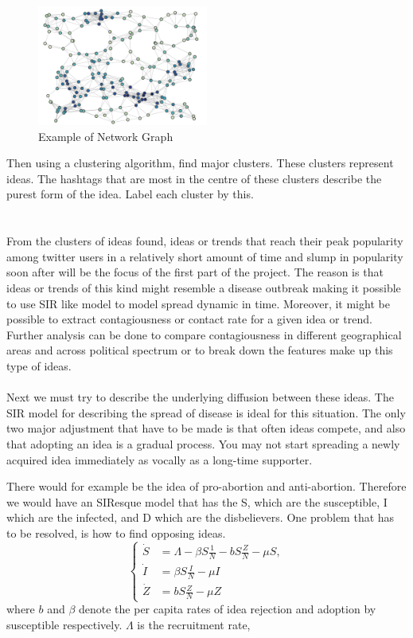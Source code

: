 \documentclass[11pt]{article}
\theoremstyle{plain}
\theoremstyle{definition}
\begin{document}
\begin{figure}[h]
\caption{Example of Network Graph}
\centering
\includegraphics[width=0.5\textwidth]{network_graph}
\end{figure}
Then using a clustering algorithm, find major clusters. These clusters represent ideas. The hashtags that are most in the centre of these clusters describe the purest form of the idea. Label each cluster by this.\\
\\ 
\\ From the clusters of ideas found, ideas or trends that reach their peak popularity among twitter users in a relatively short amount of time and slump in popularity soon after will be the focus of the first part of the project. The reason is that ideas or trends of this kind might resemble a disease outbreak making it possible to use SIR like model to model spread dynamic in time. Moreover, it might be possible to extract contagiousness or contact rate for a given idea or trend. Further analysis can be done to compare contagiousness in different geographical areas and across political spectrum or to break down the features make up this type of ideas.
\\\\
Next we must try to describe the underlying diffusion between these ideas. The SIR model for describing the spread of disease is ideal for this situation. The only two major adjustment that have to be made is that often ideas compete, and also that adopting an idea is a gradual process. You may not start spreading a newly acquired idea immediately as vocally as a long-time supporter. 






 There would for example be the idea of pro-abortion and anti-abortion. Therefore we would have an SIResque model that has the S, which are the susceptible, I which are the infected, and D which are the disbelievers. One problem that has to be resolved, is how to find opposing ideas.
\[
  \begin{cases}
                                   \dot{S} &= \Lambda - \beta S \frac{1}{N} - bS \frac{Z}{N} - \mu S, \\
                                   \dot{I} &= \beta S \frac{I}{N} - \mu I \\
                                   \dot{Z} &= bS\frac{Z}{N} - \mu Z
  \end{cases}
\]
where $b$ and $\beta$ denote the per capita rates of idea rejection and adoption by susceptible respectively. $\Lambda$ is the recruitment rate, 
\end{document}
